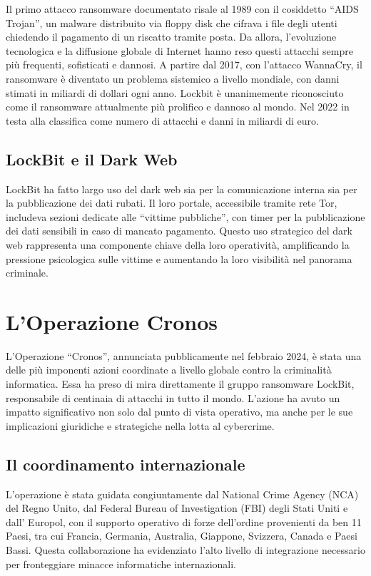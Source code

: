\documentclass[a4paper,12pt]{article}
\begin{document}
Il primo attacco ransomware documentato risale al 1989 con il cosiddetto “AIDS Trojan”, un malware distribuito via floppy disk che cifrava i file degli utenti chiedendo il pagamento di un riscatto tramite posta. Da allora, l'evoluzione tecnologica e la diffusione globale di Internet hanno reso questi attacchi sempre più frequenti, sofisticati e dannosi. A partire dal 2017, con l'attacco WannaCry, il ransomware è diventato un problema sistemico a livello mondiale, con danni stimati in miliardi di dollari ogni anno.
Lockbit è unanimemente riconosciuto come il ransomware attualmente più prolifico e dannoso al mondo. Nel 2022 in testa alla classifica come numero di attacchi e danni in miliardi di euro. 

\subsection{LockBit e il Dark Web}
LockBit ha fatto largo uso del dark web sia per la comunicazione interna sia per la pubblicazione dei dati rubati. Il loro portale, accessibile tramite rete Tor, includeva sezioni dedicate alle “vittime pubbliche”, con timer per la pubblicazione dei dati sensibili in caso di mancato pagamento. Questo uso strategico del dark web rappresenta una componente chiave della loro operatività, amplificando la pressione psicologica sulle vittime e aumentando la loro visibilità nel panorama criminale.

\section{L'Operazione Cronos}
L’Operazione “Cronos”, annunciata pubblicamente nel febbraio 2024, è stata una delle più imponenti azioni coordinate a livello globale contro la criminalità informatica. Essa ha preso di mira direttamente il gruppo ransomware LockBit, responsabile di centinaia di attacchi in tutto il mondo. L’azione ha avuto un impatto significativo non solo dal punto di vista operativo, ma anche per le sue implicazioni giuridiche e strategiche nella lotta al cybercrime.

\subsection{Il coordinamento internazionale}
L'operazione è stata guidata congiuntamente dal National Crime Agency (NCA) del Regno Unito, dal Federal Bureau of Investigation (FBI) degli Stati Uniti e dall' Europol, con il supporto operativo di forze dell’ordine provenienti da ben 11 Paesi, tra cui Francia, Germania, Australia, Giappone, Svizzera, Canada e Paesi Bassi. Questa collaborazione ha evidenziato l’alto livello di integrazione necessario per fronteggiare minacce informatiche internazionali.
\end{document}
